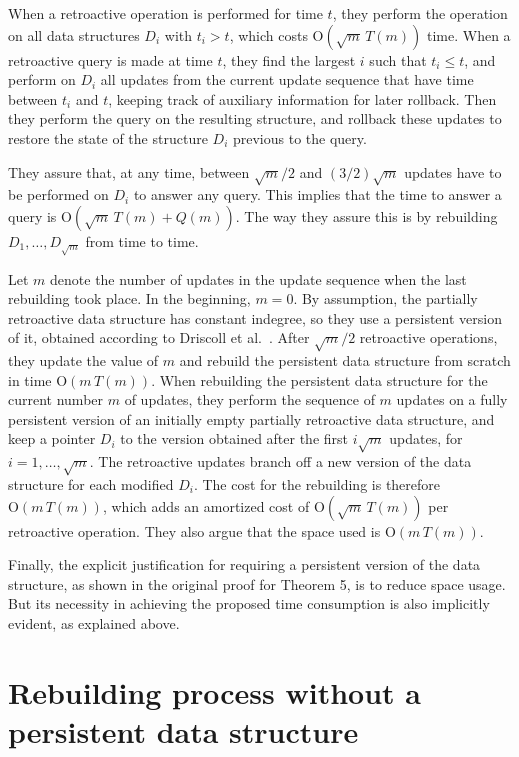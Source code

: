 \documentclass[3p,times,procedia]{elsarticle}
\newcommand{\Oh}{\mathrm{O}}
\begin{document}
When a retroactive operation is performed for time $t$, they perform the operation 
on all data structures $D_i$ with $t_i>t$, which costs $\Oh(\sqrt{m}\,T(m))$ time.  
When a retroactive query is made at time $t$, they find the largest $i$ such that 
$t_i \leq t$, and perform on $D_i$ all updates from the current update sequence that 
have time between $t_i$ and $t$, keeping track of auxiliary information for later rollback. 
Then they perform the query on the resulting structure, and rollback these 
updates to restore the state of the structure $D_i$ previous to the query.

They assure that, at any time, between $\sqrt{m}/2$ and $(3/2)\sqrt{m}$ 
updates have to be performed on $D_i$ to answer any query.  
This implies that the time to answer a query is $\Oh(\sqrt{m}\,T(m)+Q(m))$.  
The way they assure this is by rebuilding $D_1,\ldots,D_{\sqrt{m}}$ from time to time. 

Let $m$ denote the number of updates in the update sequence when the last rebuilding took place.
In the beginning, $m=0$. 
By assumption, the partially retroactive data structure has constant indegree, so they use 
a persistent version of it, obtained according to Driscoll et al.~\cite{DriscollSST1989}.
After $\sqrt{m}/2$ retroactive operations, they update the value of $m$ and 
rebuild the persistent data structure from scratch in time $\Oh(m\,T(m))$. 
When rebuilding the persistent data structure for the current number $m$ of updates, 
they perform the sequence of $m$ updates on a fully persistent version of an 
initially empty partially retroactive data structure, and keep a pointer $D_i$ 
to the version obtained after the first $i\sqrt{m}$ updates, for $i = 1,\ldots,\sqrt{m}$. 
The retroactive updates branch off a new version of the data structure for each modified $D_i$.  
The cost for the rebuilding is therefore $\Oh(m\,T(m))$, 
which adds an amortized cost of $\Oh(\sqrt{m}\,T(m))$ per retroactive operation. 
They also argue that the space used is $\Oh(m\,T(m))$.

Finally, the explicit justification for requiring a persistent version of the data structure, 
as shown in the original proof for Theorem 5, is to reduce space usage. But its necessity in 
achieving the proposed time consumption is also implicitly evident, as explained above.

\section{Rebuilding process without a persistent data structure}\label{sec:rebuilding}
\end{document}
